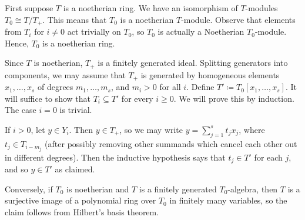First suppose $T$ is a noetherian ring.
We have an isomorphism of $T$-modules $T_0\cong T/T_+$. This means that $T_0$ is
a noetherian $T$-module. Observe that elements from $T_i$ for $i\neq 0$ act  trivially
on $T_0$, so $T_0$ is actually a Noetherian $T_0$-module. Hence, $T_0$ is a noetherian
ring.

Since $T$ is noetherian, $T_+$ is a finitely generated ideal. Splitting generators
into components, we may assume that  $T_+$ is generated by homogeneous elements
$x_1, \ldots, x_s$ of degrees $m_1, \ldots, m_s$, and $m_i > 0$ for all $i$. Define
$T' \coloneqq T_0[x_1, \ldots, x_s]$. It will suffice to show that $T_i \subseteq T'$
for every $i\geq 0$. We will prove this by induction. The case $i = 0$ is trivial.

If $i > 0$, let $y \in Y_i$. Then $y \in T_+$, so we may write $y = \sum_{j=1}^s t_jx_j$,
where $t_j \in T_{i - m_j}$ (after possibly removing other summands which cancel
each other out in different degrees). Then the inductive hypothesis says that
$t_j \in T'$ for each $j$, and so $y \in T'$ as claimed.

Conversely, if $T_0$ is noetherian and $T$ is a finitely generated $T_0$-algebra,
then $T$ is a surjective image of a polynomial ring over  $T_0$ in finitely many
variables, so the claim follows from Hilbert's basis theorem.

